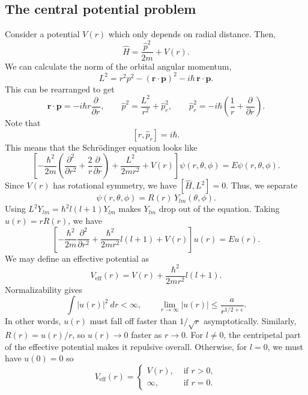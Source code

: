 \documentclass[11pt]{article}
\newcommand\ve[1]{\boldsymbol{#1}}
\newcommand\pp[3][]{\frac{\partial^{#1}{#2}}{\partial {#3}^{#1}}}
\def\vr{\ve{r}}
\def\vp{\ve{p}}
\theoremstyle{definition}
\theoremstyle{remark}
\numberwithin{equation}{section}
\begin{document}
    \subsection{The central potential problem}
    Consider a potential $V(r)$ which only depends on radial distance.
    Then, \[
        \hat{H} = \frac{\hat{p}^2}{2m} + V(r).
    \] We can calculate the norm of the orbital angular momentum, \[
        L^2 = r^2p^2 - (\vr \cdot \vp)^2 - i\hbar\,\vr\cdot\vp.
    \] This can be rearranged to get \[
        \vr\cdot\vp = -i\hbar r\pp{}{r}, \qquad 
        \hat{p}^2 = \frac{L^2}{r^2} + \hat{p}_r^2, \qquad
        \hat{p}_r^2 = -i\hbar \left(\frac{1}{r} + \pp{}{r}\right).
    \] Note that \[
        [r, \hat{p}_r] = i\hbar.
    \] This means that the Schr\"odinger equation looks like \[
        \left[-\frac{\hbar^2}{2m}\left(\pp[2]{}{r} + \frac{2}{r}\pp{}{r}\right) +
        \frac{L^2}{2mr^2} + V(r)\right]\psi(r, \theta, \phi) = E\psi(r, \theta, \phi).
    \] Since $V(r)$ has rotational symmetry, we have $[\hat{H}, L^2] = 0$. Thus, we
    separate \[
        \psi(r, \theta, \phi) = R(r)\,Y_{lm}(\theta, \phi).
    \] Using $L^2Y_{lm} = \hbar^2l(l+1)Y_{lm}$ makes $Y_{lm}$ drop out of the
    equation. Taking $u(r) = rR(r)$, we have \[
        \left[-\frac{\hbar^2}{2m}\pp[2]{}{r} + \frac{\hbar^2}{2mr^2}l(l + 1) +
        V(r)\right]u(r) = Eu(r).
    \] We may define an effective potential as \[
        V_\text{eff}(r) = V(r) + \frac{\hbar^2}{2mr^2}l(l+1).
    \] Normalizability gives \[
        \int |u(r)|^2 \:dr < \infty, \qquad
        \lim_{r \to \infty} |u(r)| \leq \frac{a}{r^{1 /2 + \epsilon}}.
    \] In other words, $u(r)$ must fall off faster than $1 / \sqrt{r}$
    asymptotically. Similarly, $R(r) = u(r) / r$, so $u(r) \to 0$ faster as $r
    \to 0$. For $l \neq 0$, the centripetal part of the effective potential makes it
    repulsive overall. Otherwise, for $l = 0$, we must have $u(0) = 0$ so \[
        V_\text{eff}(r) = \begin{cases}
            V(r), &\text{ if } r > 0, \\
            \infty, &\text{ if } r = 0.
        \end{cases}
    \] 
\end{document}
